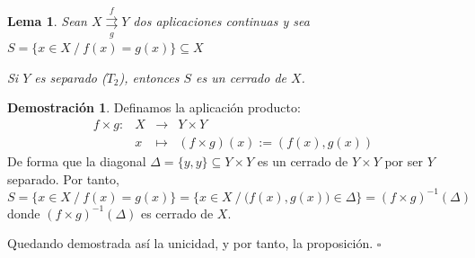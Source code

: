 \documentclass[12pt,twoside]{report}
\theoremstyle{azul}
\theoremstyle{azul2}
\theoremstyle{plain}
\newtheorem*{lem}{Lema}
\theoremstyle{definition}
\newtheorem*{dem}{Demostración}
\theoremstyle{remark}
\begin{document}
\begin{lem}
Sean $X \underset{g}{\overset{f}{\rightrightarrows}} Y$ dos aplicaciones continuas y sea $S=\{ x \in X \: / \: f(x)=g(x) \} \subseteq X$ \vspace{-3mm} 
\begin{tcolorbox}
\begin{center}
    Si $Y$ es separado ($T_2$), entonces $S$ es un cerrado de $X$.
\end{center}
\end{tcolorbox}
\end{lem}
\begin{dem}
Definamos la aplicación producto:
$$\begin{array}{rrcl}
     f \times g : & X & \longrightarrow & Y \times Y \\
     \: & x & \longmapsto & (f \times g)(x):=(f(x), g(x))
\end{array}$$
De forma que la diagonal $\Delta = \{y,y\} \subseteq Y \times Y$ es un cerrado de $Y \times Y$ por ser $Y$ separado. Por tanto, $$S=\{ x \in X \: / \: f(x)=g(x) \}=\big\{ x \in X \: / \: \big(f(x),g(x)\big) \in \Delta \big\} = (f \times g)^{-1}(\Delta)$$ 
donde $(f \times g)^{-1}(\Delta)$ es cerrado de $X$.

Quedando demostrada así la unicidad, y por tanto, la proposición. \hfill $\square$
\end{dem}\label{densaplic}
\end{document}
